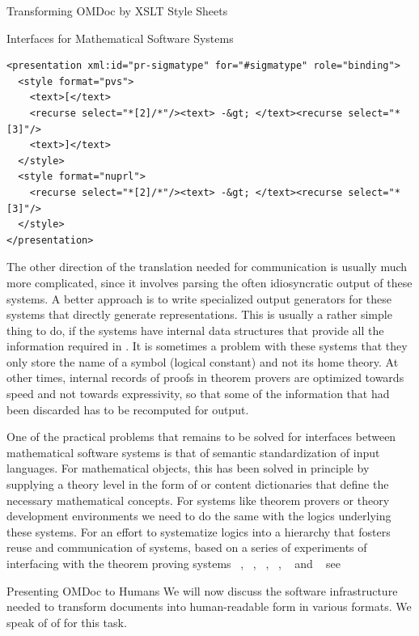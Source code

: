 \begin{tchapter}[id=transform-xsl,short=Transforming OMDoc]{Transforming OMDoc by XSLT Style Sheets}
\begin{tsection}[id=omdoctosys,short=Interfaces for Systems]{{\omdoc} Interfaces for Mathematical Software Systems}
\begin{lstlisting}[label=lst:system-language,
  caption={A {\element{symbol}} in a Language Definition Theory},
  index={symbol,presentation,style}]
<presentation xml:id="pr-sigmatype" for="#sigmatype" role="binding">
  <style format="pvs">
    <text>[</text>
    <recurse select="*[2]/*"/><text> -&gt; </text><recurse select="*[3]"/>
    <text>]</text>
  </style>
  <style format="nuprl">
    <recurse select="*[2]/*"/><text> -&gt; </text><recurse select="*[3]"/>
  </style>
</presentation>
\end{lstlisting}

The other direction of the translation needed for communication is usually much
more complicated, since it involves parsing the often idiosyncratic output of
these systems. A better approach is to write specialized output generators for
these systems that directly generate {\omdoc} representations. This is usually a
rather simple thing to do, if the systems have internal data structures that
provide all the information required in {\omdoc}. It is sometimes a problem with
these systems that they only store the name of a symbol (logical constant) and not
its home theory. At other times, internal records of proofs in theorem provers are
optimized towards speed and not towards expressivity, so that some of the
information that had been discarded has to be recomputed for {\omdoc} output.

One of the practical problems that remains to be solved for interfaces between
mathematical software systems is that of semantic standardization of input
languages. For mathematical objects, this has been solved in principle by supplying a
theory level in the form of {\openmath} or {\omdoc} content dictionaries that define the
necessary mathematical concepts. For systems like theorem provers or theory development
environments we need to do the same with the logics underlying these systems. For an
effort to systematize logics into a hierarchy that fosters reuse and communication of
systems, based on a series of experiments of interfacing with the theorem proving systems
{\OMEGA}~\cite{BenzmuellerEtAl:otama97}, {\inka}~\cite{HuSe:itng96}, {\pvs}~\cite{OwRu92},
{\lambdaclam}~\cite{RicSmaGre:ppihol98}, {\tps}~\cite{AnBi:tatps96} and
{\coq}~\cite{CoqManual} see {}
\end{tsection}

\begin{tsection}[id=omdoc2pres]{Presenting OMDoc to Humans}
We will now discuss the software infrastructure needed to transform {\omdoc}
documents into human-readable form in various formats. We speak of of {\omdoc}
{} for this task.


\end{tsection}
\end{tchapter}
